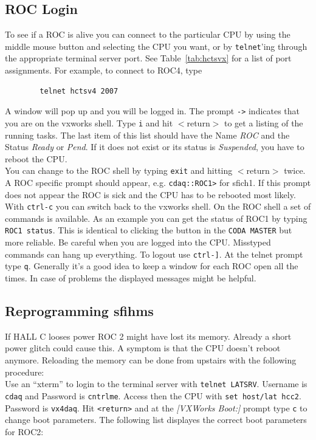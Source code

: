 \subsection{ROC Login} \label{login}  
To see if a ROC is alive you can connect to the particular CPU
by using the middle mouse button and selecting the CPU you want,
or by {\tt telnet}'ing through the appropriate terminal server
port. See Table~\ref{tab:hctsvx} for a list of port assignments.
For example, to connect to ROC4, type
\begin{verbatim}
        telnet hctsv4 2007
\end{verbatim}
A window will pop up and you will
be logged in. The prompt \verb|->| indicates that you are on the vxworks 
shell.
Type \verb|i| and hit $<$return$>$ to get a listing of the running tasks.
The last item of this list should have the Name {\em ROC} and the Status
{\em Ready} or {\em Pend}. If it does not exist or its status is 
{\em Suspended}, you have to reboot the CPU.\\
You can change to the ROC shell by typing \verb|exit| and 
hitting $<$return$>$ twice. A ROC specific prompt should appear, e.g. 
\verb|cdaq::ROC1>| for sfich1. If this prompt does not appear the ROC 
is sick and the CPU has to be rebooted most likely. With \verb|ctrl-c| 
you can switch back to the vxworks shell. On the ROC shell a set of commands
is available. As an example you can get the status of ROC1 by typing 
\verb|ROC1 status|. This is identical to clicking the button 
 in the \verb|CODA MASTER| but more reliable.     
Be careful when you are logged into the CPU. Misstyped commands can 
hang up everything.  
To logout use \verb|ctrl-]|. At the telnet prompt type \verb|q|.
Generally it's a good idea to keep a window for each ROC open all the times. 
In case of problems the displayed messages might be helpful. 

\subsection{Reprogramming sfihms}
\label{sfihms}
If HALL C looses power ROC 2 might have lost its memory. Already a short power
glitch could cause this. A symptom is that the CPU doesn't reboot anymore.
Reloading the memory can be done from upstairs with the following 
procedure:\\

\noindent
Use an ``xterm'' to login to the terminal server with \verb|telnet LATSRV|.
Username is \verb|cdaq| and Password is \verb|cntrlme|.
Access then the CPU with \verb|set host/lat hcc2|. Password is \verb|vx4daq|.
Hit \verb|<return>| and at the {\em [VXWorks Boot:]} prompt type \verb|c|
to change boot parameters. 
The following list displayes the correct boot parameters for ROC2:\\

